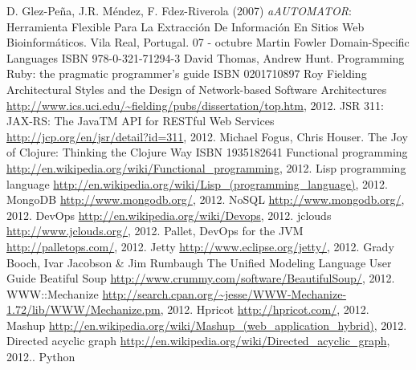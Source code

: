 \documentclass[a4paper,12pt,twoside]{report}
\begin{document}
\begin{thebibliography}{1}

  D. Glez-Peña, J.R. Méndez, F. Fdez-Riverola (2007)
  \newblock \emph{aAUTOMATOR}: Herramienta Flexible Para La
  Extracción De Información En Sitios Web Bioinformáticos. Vila Real,
  Portugal. 07 - octubre
  Martin Fowler
  \newblock Domain-Specific Languages
  \newblock ISBN 978-0-321-71294-3
  David Thomas, Andrew Hunt.
  \newblock Programming Ruby: the pragmatic programmer's guide
  \newblock ISBN 0201710897
  Roy Fielding
  \newblock Architectural Styles and
  the Design of Network-based Software Architectures
  \newblock
  \url{http://www.ics.uci.edu/~fielding/pubs/dissertation/top.htm},
  2012.
  \newblock JSR 311: JAX-RS: The JavaTM API for RESTful Web Services
  \newblock \url{http://jcp.org/en/jsr/detail?id=311}, 2012.
  Michael Fogus, Chris Houser.
  \newblock The Joy of Clojure: Thinking the Clojure Way
  \newblock ISBN 1935182641
  \newblock Functional programming
  \newblock \url{http://en.wikipedia.org/wiki/Functional_programming}, 2012.
  \newblock Lisp programming language
  \newblock \url{http://en.wikipedia.org/wiki/Lisp_(programming_language)}, 2012.
  \newblock MongoDB
  \newblock \url{http://www.mongodb.org/}, 2012.
  \newblock NoSQL
  \newblock \url{http://www.mongodb.org/}, 2012.
  \newblock DevOps
  \url{http://en.wikipedia.org/wiki/Devops}, 2012.
  \newblock jclouds
  \newblock \url{http://www.jclouds.org/}, 2012.
  \newblock Pallet, DevOps for the JVM
  \newblock \url{http://palletops.com/}, 2012.
  \newblock Jetty
  \newblock \url{http://www.eclipse.org/jetty/}, 2012.
  Grady Booch, Ivar Jacobson \& Jim Rumbaugh
  \newblock The Unified Modeling Language User Guide
  \newblock Beatiful Soup
  \newblock \url{http://www.crummy.com/software/BeautifulSoup/}, 2012.
  \newblock WWW::Mechanize
  \newblock
  \url{http://search.cpan.org/~jesse/WWW-Mechanize-1.72/lib/WWW/Mechanize.pm},
  2012.
  \newblock Hpricot
  \newblock \url{http://hpricot.com/}, 2012.
  \newblock Mashup
  \newblock \url{http://en.wikipedia.org/wiki/Mashup_(web_application_hybrid)}, 2012.
  \newblock Directed acyclic graph
  \newblock \url{http://en.wikipedia.org/wiki/Directed_acyclic_graph},
  2012..
  \newblock Python

\end{thebibliography}
\end{document}

